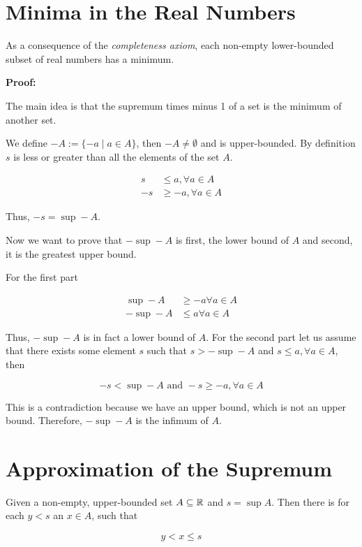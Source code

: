 \section{Minima in the Real Numbers}

As a consequence of the \emph{completeness axiom}, each non-empty lower-bounded subset of real numbers has a minimum.

\textbf{Proof:}

The main idea is that the supremum times minus 1 of a set is the minimum of another set.

We define \(- A := \{-a \mid a \in A\}\), then \(-A \ne \emptyset\) and is upper-bounded.
By definition \(s\) is less or greater than all the elements of the set \(A\).

\begin{align*}
	s  & \le a, \forall a \in A  \\
	-s & \ge -a, \forall a \in A
\end{align*}

Thus, \(-s = \sup-A\).

Now we want to prove that \(-\sup-A\) is first, the lower bound of \(A\) and second, it is the greatest upper bound.

For the first part

\begin{align*}
	\sup-A    & \ge -a \forall a \in A \\
	- \sup -A & \le a \forall a \in A
\end{align*}

Thus, \(-\sup-A\) is in fact a lower bound of \(A\). For the second part let us
assume that there exists some element \(s\) such that \(s > -\sup-A\) and \(s \le a, \forall a \in A\), then

\[
	-s < \sup -A  \text{ and } -s \ge -a, \forall a \in A
\]

This is a contradiction because we have an upper bound, which is not an upper bound. Therefore,
\(-\sup-A\) is the infimum of \(A\).

\QED

\section{Approximation of the Supremum}

Given a non-empty, upper-bounded set \(A \subseteq \mathbb{R}\) and \(s = \sup A\). Then there is for each \(y < s\)
an \(x \in A\), such that

\[
	y < x \le s
\]

